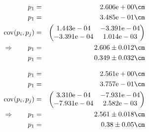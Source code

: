 \begin{eqnarray}
    p_1 &=& 2.606\mathrm{e}+00 \cm \nonumber \\
    p_1 &=& 3.485\mathrm{e}-01 \cm \nonumber \\
    \mathrm{cov}(p_i, p_j) &=& 
    \begin{pmatrix}
        1.443\mathrm{e}-04 &-3.391\mathrm{e}-04 \\
        -3.391\mathrm{e}-04 &1.014\mathrm{e}-03 \\
    \end{pmatrix}
\\ \Rightarrow \qquad
    p_1 &=& 2.606 \pm 0.012 \cm\\
    p_1 &=& 0.349 \pm 0.032 \cm
\end{eqnarray}

\begin{eqnarray}
    p_1 &=& 2.561\mathrm{e}+00 \cm \nonumber \\
    p_1 &=& 3.757\mathrm{e}-01 \cm \nonumber \\
    \mathrm{cov}(p_i, p_j) &=& 
    \begin{pmatrix}
        3.310\mathrm{e}-04 &-7.931\mathrm{e}-04 \\
        -7.931\mathrm{e}-04 &2.582\mathrm{e}-03 \\
    \end{pmatrix}
\\ \Rightarrow \qquad
    p_1 &=& 2.561 \pm 0.018 \cm\\
    p_1 &=& 0.38 \pm 0.05 \cm
\end{eqnarray}

